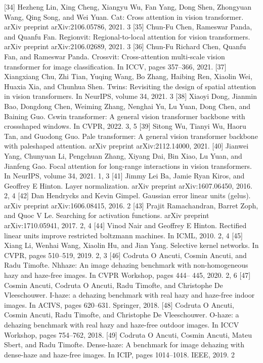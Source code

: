 [34] Hezheng Lin, Xing Cheng, Xiangyu Wu, Fan Yang, Dong Shen, Zhongyuan Wang, Qing Song, and Wei Yuan. Cat: Cross attention in vision transformer. arXiv preprint arXiv:2106.05786, 2021. 3
[35] Chun-Fu Chen, Rameswar Panda, and Quanfu Fan. Regionvit: Regional-to-local attention for vision transformers. arXiv preprint arXiv:2106.02689, 2021. 3
[36] Chun-Fu Richard Chen, Quanfu Fan, and Rameswar Panda. Crossvit: Cross-attention multi-scale vision transformer for image classification. In ICCV, pages 357–366, 2021.
[37] Xiangxiang Chu, Zhi Tian, Yuqing Wang, Bo Zhang, Haibing Ren, Xiaolin Wei, Huaxia Xia, and Chunhua Shen. Twins: Revisiting the design of spatial attention in vision transformers. In NeurIPS, volume 34, 2021. 3
[38] Xiaoyi Dong, Jianmin Bao, Dongdong Chen, Weiming Zhang, Nenghai Yu, Lu Yuan, Dong Chen, and Baining Guo. Cswin transformer: A general vision transformer backbone with crossshaped windows. In CVPR, 2022. 3, 5
[39] Sitong Wu, Tianyi Wu, Haoru Tan, and Guodong Guo. Pale transformer: A general vision transformer backbone with paleshaped attention. arXiv preprint arXiv:2112.14000, 2021.
[40] Jianwei Yang, Chunyuan Li, Pengchuan Zhang, Xiyang Dai, Bin Xiao, Lu Yuan, and Jianfeng Gao. Focal attention for long-range interactions in vision transformers. In NeurIPS, volume 34, 2021. 1, 3
[41] Jimmy Lei Ba, Jamie Ryan Kiros, and Geoffrey E Hinton. Layer normalization. arXiv preprint arXiv:1607.06450, 2016. 2, 4
[42] Dan Hendrycks and Kevin Gimpel. Gaussian error linear units (gelus). arXiv preprint arXiv:1606.08415, 2016. 2
[43] Prajit Ramachandran, Barret Zoph, and Quoc V Le. Searching for activation functions. arXiv preprint arXiv:1710.05941, 2017. 2, 4
[44] Vinod Nair and Geoffrey E Hinton. Rectified linear units improve restricted boltzmann machines. In ICML, 2010. 2, 4
[45] Xiang Li, Wenhai Wang, Xiaolin Hu, and Jian Yang. Selective kernel networks. In CVPR, pages 510–519, 2019. 2, 3
[46] Codruta O Ancuti, Cosmin Ancuti, and Radu Timofte. Nhhaze: An image dehazing benchmark with non-homogeneous hazy and haze-free images. In CVPR Workshop, pages 444– 445, 2020. 2, 6
[47] Cosmin Ancuti, Codruta O Ancuti, Radu Timofte, and Christophe De Vleeschouwer. I-haze: a dehazing benchmark with real hazy and haze-free indoor images. In ACIVS, pages 620–631. Springer, 2018.
[48] Codruta O Ancuti, Cosmin Ancuti, Radu Timofte, and Christophe De Vleeschouwer. O-haze: a dehazing benchmark with real hazy and haze-free outdoor images. In ICCV Workshop, pages 754–762, 2018.
[49] Codruta O Ancuti, Cosmin Ancuti, Mateu Sbert, and Radu Timofte. Dense-haze: A benchmark for image dehazing with dense-haze and haze-free images. In ICIP, pages 1014–1018. IEEE, 2019. 2
